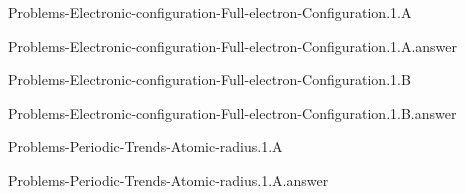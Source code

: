 \documentclass[main.tex]{subfiles}
\newcommand\chapterlabel{}
\begin{document}
\renewcommand\chapterlabel{Ch-radiation}
\begin{question}[ID=\the\value{numA}]
{Problems-Electronic-configuration-Full-electron-Configuration.1.A}
\end{question}
   \begin{Form}
   \TextField[multiline,backgroundcolor=gray!20,borderwidth=0,width=0.43\textwidth  ,height=115pt, name=\the\value{numA}]  { }\end{Form}
\begin{solution}
{Problems-Electronic-configuration-Full-electron-Configuration.1.A.answer}
\hspace{0.1cm}
\end{solution}


\renewcommand\chapterlabel{Ch-radiation}
\begin{question}[ID=\the\value{numA}]
{Problems-Electronic-configuration-Full-electron-Configuration.1.B}
\end{question}
   \begin{Form}
   \TextField[multiline,backgroundcolor=gray!20,borderwidth=0,width=0.43\textwidth  ,height=115pt, name=\the\value{numA}]  { }\end{Form}
\begin{solution}
{Problems-Electronic-configuration-Full-electron-Configuration.1.B.answer}
\hspace{0.1cm}
\end{solution}


\renewcommand\chapterlabel{Ch-radiation}
\begin{question}[ID=\the\value{numA}]
{Problems-Periodic-Trends-Atomic-radius.1.A}
\end{question}
   \begin{Form}
   \TextField[multiline,backgroundcolor=gray!20,borderwidth=0,width=0.43\textwidth  ,height=115pt, name=\the\value{numA}]  { }\end{Form}
\begin{solution}
{Problems-Periodic-Trends-Atomic-radius.1.A.answer}
\hspace{0.1cm}
\end{solution}
\end{document}
